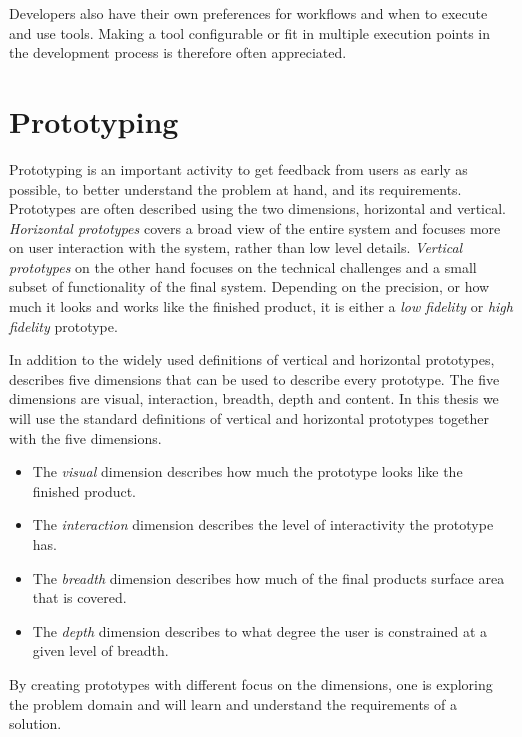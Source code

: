 \documentclass{report}
\begin{document}
Developers also have their own preferences for workflows and when to execute and use tools. Making a tool configurable or fit in multiple execution points in the development process is therefore often appreciated.

\section{Prototyping}
Prototyping is an important activity to get feedback from users as early as possible, to better understand the problem at hand, and its requirements. Prototypes are often described using the two dimensions, horizontal and vertical. \textit{Horizontal prototypes} covers a broad view of the entire system and focuses more on user interaction with the system, rather than low level details. \textit{Vertical prototypes} on the other hand focuses on the technical challenges and a small subset of functionality of the final system. Depending on the precision, or how much it looks and works like the finished product, it is either a \textit{low fidelity} or \textit{high fidelity} prototype. 

In addition to the widely used definitions of vertical and horizontal prototypes, \cite{prototype-dimensions} describes five dimensions that can be used to describe every prototype. The five dimensions are visual, interaction, breadth, depth and content. In this thesis we will use the standard definitions of vertical and horizontal prototypes together with the five dimensions.  

\begin{itemize}
    \item The \textit{visual} dimension describes how much the prototype looks like the finished product. 
    
    \item The \textit{interaction} dimension describes the level of interactivity the prototype has. 
    
    \item The \textit{breadth} dimension describes how much of the final products surface area that is covered. 
    
    \item The \textit{depth} dimension describes to what degree the user is constrained at a given level of breadth.
\end{itemize}

By creating prototypes with different focus on the dimensions, one is exploring the problem domain and will learn and understand the requirements of a solution.
\end{document}
